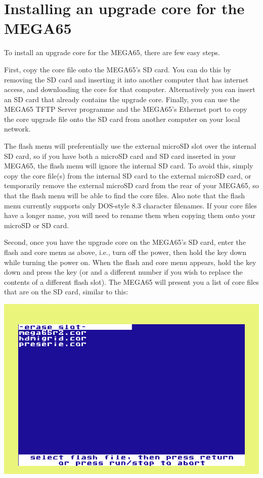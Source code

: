 \section{Installing an upgrade core for the MEGA65}

To install an upgrade core for the MEGA65, there are few easy steps.

First, copy the core file onto the MEGA65's SD card.  You can do this by removing the SD card and inserting
it into another computer that has internet access, and downloading the core for that computer. Alternatively
you can insert an SD card that already contains the upgrade core. Finally, you can use the MEGA65 TFTP Server
programme and the MEGA65's Ethernet port to copy the core upgrade file onto the SD card from another computer
on your local network.

The flash menu will preferentially use the external microSD slot over
the internal SD card, so if you have both a microSD card and SD card
inserted in your MEGA65, the flash menu will ignore the
internal SD card. To avoid this, simply copy the core file(s) from the internal SD
card to the external microSD card, or temporarily remove the external
microSD card from the rear of your MEGA65, so that the flash menu will
be able to find the core files.  Also note that the flash menu
currently supports only DOS-style 8.3 character filenames. If your
core files have a longer name, you will need to rename them when
copying them onto your microSD or SD card.

Second, once you have the upgrade core on the MEGA65's SD card, enter the flash and core menu as above,
i.e., turn off the power, then hold the  key down while turning the power on.  When the flash
and core menu appears, hold the  key down and press the
 key (or  and a different number if you wish to replace the
contents of a different flash slot).  The MEGA65
will present you a list of core files that are on the SD card, similar
to this:

\includegraphics[width=\linewidth]{images/ss-flashmenu-selectcore.png}

